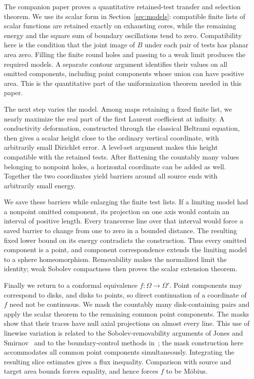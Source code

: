 The companion paper \cite{KoebeCompanion} proves a quantitative
retained-test transfer and selection theorem.  We use its scalar form
in Section~\ref{sec:models}: compatible finite lists of scalar functions
are retained exactly on exhausting cores, while the remaining energy
and the square sum of boundary oscillations tend to zero.  Compatibility
here is the condition that the joint image of $B$ under each pair of
tests has planar area zero.  Filling the finite round holes and passing
to a weak limit produces the required models.  A separate contour
argument identifies their values on all omitted components, including
point components whose union can have positive area.  This is the
quantitative part of the uniformization theorem needed in this paper.

The next step varies the model.  Among maps retaining a fixed finite
list, we nearly maximize the real part of the first Laurent coefficient
at infinity.  A conductivity deformation, constructed through the
classical Beltrami equation, then gives a scalar height close to the
ordinary vertical coordinate, with arbitrarily small Dirichlet error.
A level-set argument makes this height compatible with the retained
tests.  After flattening the countably many values belonging to nonpoint
holes, a horizontal coordinate can be added as well.  Together the two
coordinates yield barriers around all source ends with arbitrarily
small energy.

We save these barriers while enlarging the finite test lists.  If a
limiting model had a nonpoint omitted component, its projection on one
axis would contain an interval of positive length.  Every transverse
line over that interval would force a saved barrier to change from one
to zero in a bounded distance.  The resulting fixed lower bound on its
energy contradicts the construction.  Thus every omitted component is
a point, and component correspondence extends the limiting model to a
sphere homeomorphism.  Removability makes the normalized limit the
identity; weak Sobolev compactness then proves the scalar extension
theorem.

Finally we return to a conformal equivalence $f:\Omega\to\Omega'$.
Point components may correspond to disks, and disks to points, so direct
continuation of a coordinate of $f$ need not be continuous.  We mask the
countably many disk-containing pairs and apply the scalar theorem to
the remaining common point components.  The masks show that their
traces have null axial projections on almost every line.  This use of
linewise variation is related to the Sobolev-removability arguments of
Jones and Smirnov~\cite{JonesSmirnov2000} and to the boundary-control
methods in~\cite{NY2020,Ntalampekos2023}; the mask construction here
accommodates all common point components simultaneously.  Integrating
the resulting slice estimates gives a flux inequality.  Comparison with
source and target area bounds forces equality, and hence forces $f$ to
be M\"obius.

